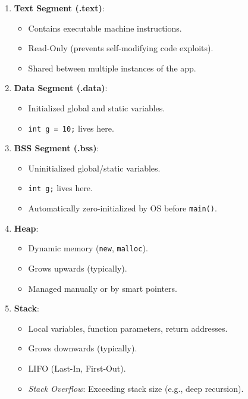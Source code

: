 \begin{enumerate}
\def\labelenumi{\arabic{enumi}.}
\tightlist
\item
  \textbf{Text Segment (.text)}:

  \begin{itemize}
  \tightlist
  \item
    Contains executable machine instructions.
  \item
    Read-Only (prevents self-modifying code exploits).
  \item
    Shared between multiple instances of the app.
  \end{itemize}
\item
  \textbf{Data Segment (.data)}:

  \begin{itemize}
  \tightlist
  \item
    Initialized global and static variables.
  \item
    \passthrough{\lstinline!int g = 10;!} lives here.
  \end{itemize}
\item
  \textbf{BSS Segment (.bss)}:

  \begin{itemize}
  \tightlist
  \item
    Uninitialized global/static variables.
  \item
    \passthrough{\lstinline!int g;!} lives here.
  \item
    Automatically zero-initialized by OS before
    \passthrough{\lstinline!main()!}.
  \end{itemize}
\item
  \textbf{Heap}:

  \begin{itemize}
  \tightlist
  \item
    Dynamic memory (\passthrough{\lstinline!new!},
    \passthrough{\lstinline!malloc!}).
  \item
    Grows upwards (typically).
  \item
    Managed manually or by smart pointers.
  \end{itemize}
\item
  \textbf{Stack}:

  \begin{itemize}
  \tightlist
  \item
    Local variables, function parameters, return addresses.
  \item
    Grows downwards (typically).
  \item
    LIFO (Last-In, First-Out).
  \item
    \emph{Stack Overflow}: Exceeding stack size (e.g., deep recursion).
  \end{itemize}
\end{enumerate}

